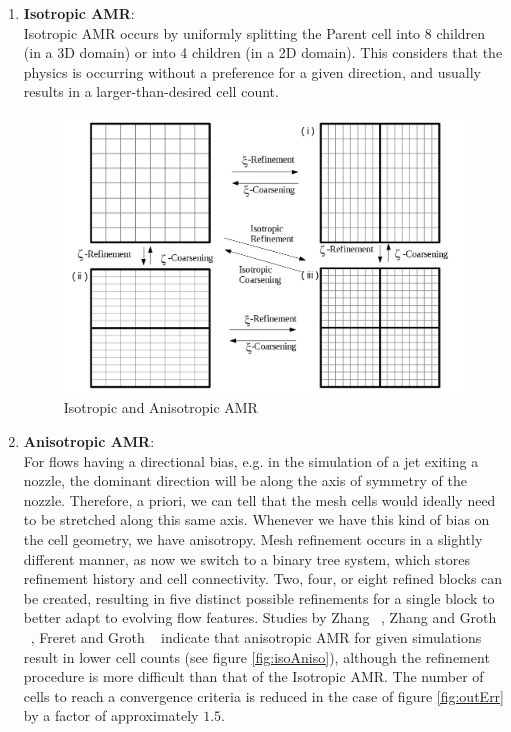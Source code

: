 \begin{enumerate}

\item \textbf{Isotropic AMR}:\\
Isotropic AMR  occurs by uniformly splitting the Parent cell into 8 children (in a 3D domain) or into 4 children (in a 2D domain). This considers that the physics is occurring without a preference for a given direction, and usually results in a larger-than-desired cell count.

\begin{figure}
    \vspace{0.2cm}
    \begin{center}
      \includegraphics[height=0.35\textwidth]{./figs/BlockDivision.jpg}
    \end{center}
    \caption{Isotropic and Anisotropic AMR \cite{zhang:2011a}}  
    \vspace{0.2cm}
\end{figure}

\item \textbf{Anisotropic AMR}: \\
For flows having a directional bias, e.g. in the simulation of a jet exiting a nozzle, the dominant direction will be along the axis of symmetry of the nozzle. Therefore, a priori, we can tell that the mesh cells would ideally need to be stretched along this same axis. Whenever we have this kind of bias on the cell geometry, we have anisotropy. Mesh refinement occurs in a slightly different manner, as now we switch to a binary tree system, which stores refinement history and cell connectivity. Two, four, or eight refined blocks can be created, resulting in five distinct possible refinements for a single block to better adapt to evolving flow features. Studies by Zhang ~\cite{zhang:2011a}, Zhang and Groth ~\cite{zhang:2011b}, Freret and Groth ~\cite{Freret:2015} indicate that anisotropic AMR for given simulations result in lower cell counts (see figure \ref{fig:isoAniso}), although the refinement procedure is more difficult than that of the Isotropic AMR. The number of cells to reach a convergence criteria is reduced in the case of figure \ref{fig:outErr} by a factor of approximately $1.5$.  \par



\end{enumerate}
